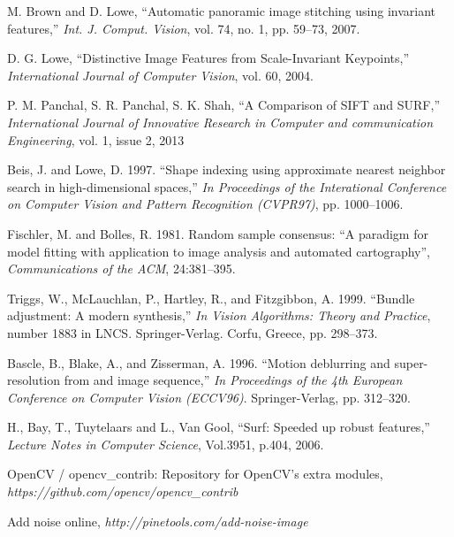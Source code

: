\documentclass[10pt,twocolumn,letterpaper]{article}
\begin{document}
\begin{thebibliography}{99}
M. Brown and D. Lowe, ``Automatic panoramic image stitching using invariant features,''
\textit{Int. J. Comput. Vision}, vol. 74, no. 1, pp. 59–73, 2007.

D. G. Lowe, ``Distinctive Image Features from Scale-Invariant Keypoints,''
\textit{International Journal of Computer Vision}, vol. 60, 2004.

P. M. Panchal, S. R. Panchal, S. K. Shah, ``A Comparison of SIFT and SURF,''
\textit{International Journal of Innovative Research in Computer and communication Engineering}, vol. 1, issue 2, 2013


Beis, J. and Lowe, D. 1997. ``Shape indexing using approximate nearest neighbor search in high-dimensional spaces,''
\textit{In Proceedings of the Interational Conference on Computer Vision and Pattern Recognition (CVPR97)}, pp. 1000–1006.

Fischler, M. and Bolles, R. 1981. Random sample consensus: ``A paradigm for model fitting with application to image analysis and automated cartography'',
\textit{Communications of the ACM}, 24:381–395.

Triggs, W., McLauchlan, P., Hartley, R., and Fitzgibbon, A. 1999. ``Bundle adjustment: A modern synthesis,''
\textit{In Vision Algorithms: Theory and Practice}, number 1883 in LNCS. Springer-Verlag. Corfu, Greece, pp. 298–373.

Bascle, B., Blake, A., and Zisserman, A. 1996. ``Motion deblurring and super-resolution from and image sequence,''
\textit{In Proceedings of the 4th European Conference on Computer Vision (ECCV96)}. Springer-Verlag, pp. 312–320.

H., Bay, T., Tuytelaars and L., Van Gool, ``Surf: Speeded up robust features,''
\textit{Lecture Notes in Computer Science}, Vol.3951, p.404, 2006.

OpenCV / opencv\_contrib: Repository for OpenCV's extra modules,
\textit{https://github.com/opencv/opencv\_contrib}

Add noise online,
\textit{http://pinetools.com/add-noise-image}

\end{thebibliography}
\end{document}
